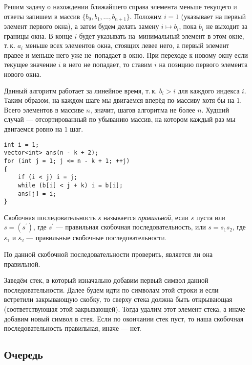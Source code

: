 Решим задачу о нахождении ближайшего справа элемента меньше \mbox{текущего} и ответы запишем в массив $\{b_0, b_1, \ldots, b_{n + 1}\}$. Положим \mbox{$i = 1$} (указывает на первый элемент первого окна), а затем будем делать \mbox{замену} $i \mapsto b_i$, пока $b_i$ не выходит за границы окна. В конце $i$ будет указывать на~минимальный элемент в этом окне, т.\,к. $a_i$ меньше всех \mbox{элементов} \mbox{окна}, стоящих левее него, а первый элемент правее и \mbox{меньше} него уже не~\mbox{попадает} в окно. При переходе к новому окну если текущее значение $i$ в него не попадает, то ставим $i$ на позицию первого элемента нового окна.

Данный алгоритм работает за линейное время, т.\,к. $b_i > i$ для каждого индекса $i$. Таким образом, на каждом шаге мы двигаемся вперёд по \mbox{массиву} хотя бы на $1$. Всего элементов в массиве $n$, значит, шагов алгоритма не более $n$. Худший случай --- отсортированный по убыванию массив, на котором каждый раз мы двигаемся ровно на $1$ шаг.

\begin{verbatim}
int i = 1;
vector<int> ans(n - k + 2);
for (int j = 1; j <= n - k + 1; ++j)
{
    if (i < j) i = j;
    while (b[i] < j + k) i = b[i];
    ans[j] = i;
}
\end{verbatim}

\begin{definition}
    Скобочная последовательность $s$ называется \textit{правильной}, если $s$ пуста или $s = (s^\prime)$, где $s^\prime$ --- правильная скобочная последовательность, или $s = s_1s_2$, где $s_1$ и $s_2$ --- правильные скобочные последовательности.
\end{definition}

\begin{problem}
    По данной скобочной последовательности проверить, является ли она правильной.
\end{problem}

Заведём стек, в который изначально добавим первый символ данной последовательности. Далее будем идти по символам этой строки и если встретили закрывающую скобку, то сверху стека должна быть открывающая (соответствующая этой закрывающей). Тогда удалим этот элемент стека, а иначе добавим новый символ в стек. Если по окончании стек пуст, то наша скобочная последовательность правильная, иначе --- нет.

\subsection{Очередь}

